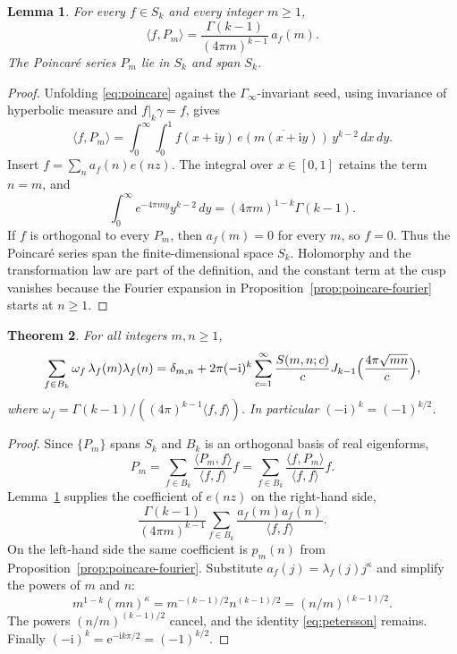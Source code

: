 \documentclass[11pt]{amsart}
\newtheorem{theorem}{Theorem}[section]
\newtheorem{lemma}[theorem]{Lemma}
\theoremstyle{definition}
\theoremstyle{remark}
\numberwithin{equation}{section}
\newcommand{\ee}{\mathrm{e}}
\newcommand{\ii}{\mathrm{i}}
\begin{document}
\begin{lemma}\label{lem:inner-poincare}
For every $f\in S_k$ and every integer $m\ge 1$,
\[
\langle f,P_m\rangle=\frac{\Gamma(k-1)}{(4\pi m)^{k-1}}\,a_f(m).
\]
The Poincar\'e series $P_m$ lie in $S_k$ and span $S_k$.
\end{lemma}

\begin{proof}
Unfolding \eqref{eq:poincare} against the $\Gamma_\infty$-invariant seed, using invariance of hyperbolic measure and $f|_k\gamma=f$, gives
\[
\langle f,P_m\rangle
=\int_0^\infty\int_0^1 f(x+\ii y)\,\overline{e(m(x+\ii y))}\,y^{k-2}\,dx\,dy.
\]
Insert $f=\sum_n a_f(n)e(nz)$. The integral over $x\in[0,1]$ retains the term $n=m$, and
\[
\int_0^\infty e^{-4\pi m y}y^{k-2}\,dy=(4\pi m)^{1-k}\Gamma(k-1).
\]
If $f$ is orthogonal to every $P_m$, then $a_f(m)=0$ for every $m$, so $f=0$. Thus the Poincar\'e series span the finite-dimensional space $S_k$. Holomorphy and the transformation law are part of the definition, and the constant term at the cusp vanishes because the Fourier expansion in Proposition~\ref{prop:poincare-fourier} starts at $n\ge 1$.
\end{proof}

\begin{theorem}\label{thm:petersson}
For all integers $m,n\ge 1$,
\begin{equation}\label{eq:petersson}
\sum_{f\in B_k}\omega_f\,\lambda_f(m)\lambda_f(n)
=\delta_{m,n}
+2\pi(-\ii)^k\sum_{c=1}^\infty\frac{S(m,n;c)}{c}
J_{k-1}\Bigl(\frac{4\pi\sqrt{mn}}{c}\Bigr),
\end{equation}
where $\omega_f=\Gamma(k-1)/((4\pi)^{k-1}\langle f,f\rangle)$. In particular $(-\ii)^k=(-1)^{k/2}$.
\end{theorem}

\begin{proof}
Since $\{P_m\}$ spans $S_k$ and $B_k$ is an orthogonal basis of real eigenforms,
\[
P_m=\sum_{f\in B_k}\frac{\langle P_m,f\rangle}{\langle f,f\rangle}f
=\sum_{f\in B_k}\frac{\langle f,P_m\rangle}{\langle f,f\rangle}f.
\]
Lemma~\ref{lem:inner-poincare} supplies the coefficient of $e(nz)$ on the right-hand side,
\[
\frac{\Gamma(k-1)}{(4\pi m)^{k-1}}\sum_{f\in B_k}\frac{a_f(m)a_f(n)}{\langle f,f\rangle}.
\]
On the left-hand side the same coefficient is $p_m(n)$ from Proposition~\ref{prop:poincare-fourier}. Substitute $a_f(j)=\lambda_f(j)j^\kappa$ and simplify the powers of $m$ and $n$:
\[
m^{1-k}(mn)^\kappa=m^{-(k-1)/2}n^{(k-1)/2}=(n/m)^{(k-1)/2}.
\]
The powers $(n/m)^{(k-1)/2}$ cancel, and the identity \eqref{eq:petersson} remains. Finally $(-\ii)^k=\ee^{-\ii k\pi/2}=(-1)^{k/2}$.
\end{proof}
\end{document}
